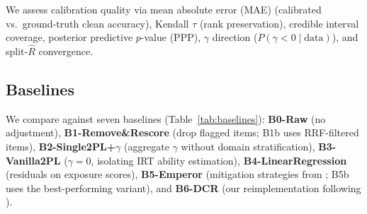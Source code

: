 We assess calibration quality via mean absolute error (MAE) (calibrated vs.\ ground-truth clean accuracy), Kendall $\tau$ (rank preservation), credible interval coverage, posterior predictive $p$-value (PPP), $\gamma$ direction ($P(\gamma\!<\!0 \mid \text{data})$), and split-$\hat{R}$ convergence.

\subsection{Baselines}
\label{sec:baselines}

We compare against seven baselines (Table~\ref{tab:baselines}): \textbf{B0-Raw} (no adjustment), \textbf{B1-Remove\&Rescore} (drop flagged items; B1b uses RRF-filtered items), \textbf{B2-Single2PL+$\gamma$} (aggregate $\gamma$ without domain stratification), \textbf{B3-Vanilla2PL} ($\gamma=0$, isolating IRT ability estimation), \textbf{B4-LinearRegression} (residuals on exposure scores), \textbf{B5-Emperor} (mitigation strategies from \citet{sun2025emperor}; B5b uses the best-performing variant), and \textbf{B6-DCR} (our reimplementation following \citealp{xu2025dcr}).

